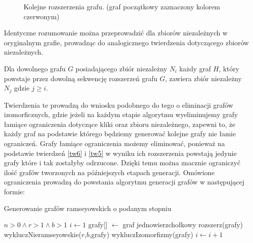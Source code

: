 \begin{figure}[H]
{\begin{tikzpicture}[node distance={15mm}, main/.style = {draw, circle}]
		\end{tikzpicture}
		}
		\hspace{15mm}
   		\caption{Kolejne rozszerzenia grafu. (graf początkowy zaznaczony kolorem czerwonym)}
   		\label{rozszerzeniekliki}
\end{figure}
Identyczne rozumowanie można przeprowadzić dla zbiorów niezależnych w oryginalnym grafie, prowadząc do analogicznego twierdzenia dotyczącego zbiorów niezależnych.
\begin{theorem}
Dla dowolnego grafu $G$ posiadającego zbiór niezależny $N_i$ każdy graf $H$, który powstaje przez dowolną sekwencję rozszerzeń grafu $G$, zawiera zbiór niezależny $N_j$ gdzie $j \geq i$.
\label{tw6}
\end{theorem}
Twierdzenia te prowadzą do wniosku podobnego do tego o eliminacji grafów izomorficznych, gdzie jeżeli na każdym etapie algorytmu wyeliminujemy grafy łamiące ograniczenia dotyczące kliki oraz zbioru niezależnego, zapewni to, że każdy graf na podstawie którego będziemy generować kolejne grafy nie łamie ograniczeń. Grafy łamiące ograniczenia możemy eliminować, ponieważ na podstawie twierdzeń \ref{tw6} i \ref{tw5} w wyniku ich rozszerzenia powstają jedynie grafy które i tak zostałyby odrzucone. Dzięki temu można znacznie ograniczyć ilość grafów tworzonych na późniejszych etapach generacji. 
Omówione ograniczenia prowadzą do powstania algorytmu generacji grafów w następującej formie:

\begin{algorithm}[H]
  \caption{Generowanie grafów ramseyowskich o podanym stopniu}
  \begin{algorithmic}
  \REQUIRE $n > 0 \land r>1 \land b>1$
  \STATE $i \gets 1$
  \STATE grafy[] $\gets$ graf jednowierzchołkowy 
    \STATE rozszerz(grafy)
    \STATE wykluczNieramseyowskie($r$,$b$,grafy)
    \STATE wykluczIzomorfizmy(grafy)
    \STATE $i \gets i + 1$
  \ENDWHILE
  \end{algorithmic}
\end{algorithm}

